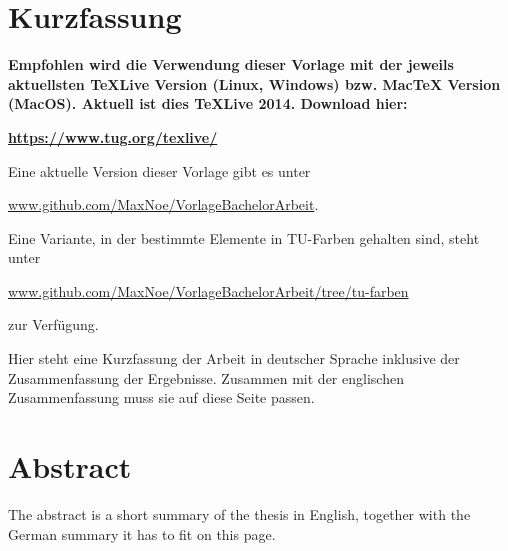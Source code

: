 \thispagestyle{plain}
\section*{Kurzfassung}

\textbf{\large Empfohlen wird die Verwendung dieser Vorlage mit der jeweils aktuellsten TeXLive Version (Linux, Windows) bzw. MacTeX Version (MacOS).
Aktuell ist dies TeXLive 2014. Download hier: }

\href{https://www.tug.org/texlive/}{\textbf{\large https://www.tug.org/texlive/}}

Eine aktuelle Version dieser Vorlage gibt es unter 

\href{https://github.com/MaxNoe/VorlageBachelorArbeit}{www.github.com/MaxNoe/VorlageBachelorArbeit}.

Eine Variante, in der bestimmte Elemente in TU-Farben gehalten sind, steht unter 

\href{https://github.com/MaxNoe/VorlageBachelorArbeit/tree/tu-farben}{www.github.com/MaxNoe/VorlageBachelorArbeit/tree/tu-farben}  

zur Verfügung.


Hier steht eine Kurzfassung der Arbeit in deutscher Sprache inklusive der Zusammenfassung der
Ergebnisse.
Zusammen mit der englischen Zusammenfassung muss sie auf diese Seite passen.

\section*{Abstract}

The abstract is a short summary of the thesis in English, together with the German summary it has to fit on this page.
